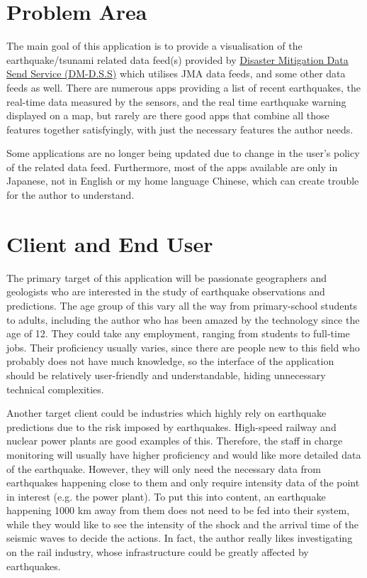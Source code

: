 \section{Problem Area}
The main goal of this application is to provide a visualisation of the earthquake/tsunami related data feed(s) provided by \href{https://dmdata.jp}{Disaster Mitigation Data Send Service (DM-D.S.S)} which utilises JMA data feeds, and some other data feeds as well. There are numerous apps providing a list of recent earthquakes, the real-time data measured by the sensors, and the real time earthquake warning displayed on a map, but rarely are there good apps that combine all those features together satisfyingly, with just the necessary features the author needs.

Some applications are no longer being updated due to change in the user's policy of the related data feed. Furthermore, most of the apps available are only in Japanese, not in English or my home language Chinese, which can create trouble for the author to understand.

\section{Client and End User}
The primary target of this application will be passionate geographers and geologists who are interested in the study of earthquake observations and predictions. The age group of this vary all the way from primary-school students to adults, including the author who has been amazed by the technology since the age of 12. They could take any employment, ranging from students to full-time jobs. Their proficiency usually varies, since there are people new to this field who probably does not have much knowledge, so the interface of the application should be relatively user-friendly and understandable, hiding unnecessary technical complexities.

Another target client could be industries which highly rely on earthquake predictions due to the risk imposed by earthquakes. High-speed railway and nuclear power plants are good examples of this. Therefore, the staff in charge monitoring will usually have higher proficiency and would like more detailed data of the earthquake. However, they will only need the necessary data from earthquakes happening close to them and only require intensity data of the point in interest (e.g. the power plant). To put this into content, an earthquake happening 1000 km away from them does not need to be fed into their system, while they would like to see the intensity of the shock and the arrival time of the seismic waves to decide the actions. In fact, the author really likes investigating on the rail industry, whose infrastructure could be greatly affected by earthquakes.

